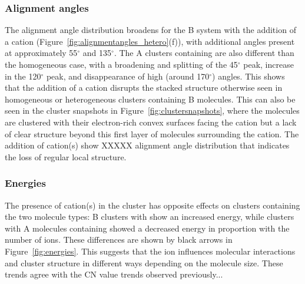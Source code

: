\subsubsection{Alignment angles}
The alignment angle distribution broadens for the B system with the addition of a cation (Figure~\ref{fig:alignmentangles_hetero}(f)), with additional angles present at approximately 55$^{\circ}$ and 135$^{\circ}$.
The A clusters containing  are also different than the homogeneous case, with a broadening and splitting of the 45$^{\circ}$ peak, increase in the 120$^{\circ}$ peak, and disappearance of high (around 170$^{\circ}$) angles. This shows that the addition of a cation disrupts the stacked structure otherwise seen in homogeneous or heterogeneous clusters containing B molecules. This can also be seen in the cluster snapshots in Figure~\ref{fig:clustersnapshots}, where the molecules are clustered with their electron-rich convex surfaces facing the cation but a lack of clear structure beyond this first layer of molecules surrounding the cation.
The addition of cation(s) show XXXXX alignment angle distribution that indicates the loss of regular local structure.

\subsubsection{Energies}


The presence of cation(s) in the cluster has opposite effects on clusters containing the two molecule types: B clusters with  show an increased energy, while clusters with A molecules containing  showed a decreased energy in proportion with the number of ions.  These differences are shown by black arrows in Figure~\ref{fig:energies}. This suggests that the ion influences molecular interactions and cluster structure in different ways depending on the molecule size. These trends agree with the CN value trends observed previously... 

